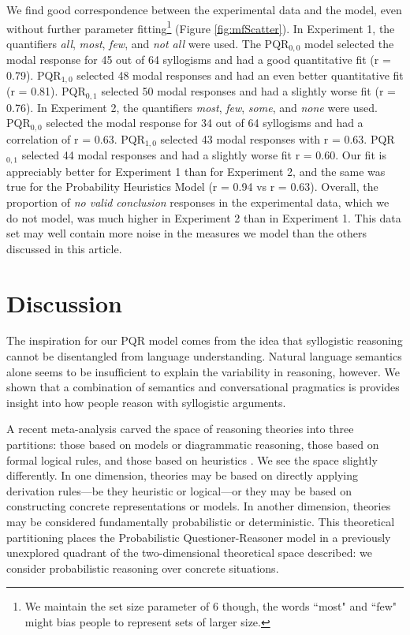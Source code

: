 \documentclass[10pt,letterpaper]{article}
\begin{document}
We find good correspondence between the experimental data and the model, even without further parameter fitting\footnote{We maintain the set size parameter of 6 though, the words ``most" and ``few" might bias people to represent sets of larger size.} (Figure \ref{fig:mfScatter}). In Experiment 1, the quantifiers \emph{all}, \emph{most}, \emph{few}, and \emph{not all} were used. The PQR$_{0,0}$ model selected the modal response for 45 out of 64 syllogisms and had a good quantitative fit (r = 0.79).  PQR$_{1,0}$ selected 48 modal responses and had an even better quantitative fit (r = 0.81). PQR$_{0,1}$ selected 50 modal responses and had a slightly worse fit (r = 0.76). 
%
In Experiment 2, the quantifiers \emph{most}, \emph{few}, \emph{some}, and \emph{none} were used. PQR$_{0,0}$ selected the modal response for 34 out of 64 syllogisms and had a correlation of r = 0.63. PQR$_{1,0}$ selected 43 modal responses with  r = 0.63. PQR$_{0,1}$ selected 44 modal responses and had a slightly worse fit r = 0.60. 
%
Our fit is appreciably better for Experiment 1 than for Experiment 2, and the same was true for the Probability Heuristics Model (r = 0.94 vs r = 0.63). Overall, the proportion of \emph{no valid conclusion} responses in the experimental data, which we do not model, was much higher in Experiment 2 than in Experiment 1. This data set may well contain more noise in the measures we model than the others discussed in this article. 


\section{Discussion}

The inspiration for our PQR model comes from the idea that syllogistic reasoning cannot be disentangled from language understanding. Natural language semantics alone seems to be insufficient to explain the variability in reasoning, however. We shown that a combination of semantics and conversational pragmatics is provides insight into how people reason with syllogistic arguments. 

A recent meta-analysis carved the space of reasoning theories into three partitions: those based on models or diagrammatic reasoning, those based on formal logical rules, and those based on heuristics \cite{Khemlani2012}. We see the space slightly differently. In one dimension, theories may be based on directly applying derivation rules---be they heuristic or logical---or they may be based on constructing concrete representations or models. In another dimension, theories may be considered fundamentally probabilistic or deterministic. This theoretical partitioning places the Probabilistic Questioner-Reasoner model in a previously unexplored quadrant of the two-dimensional theoretical space described: we consider probabilistic reasoning over concrete situations.
\end{document}
